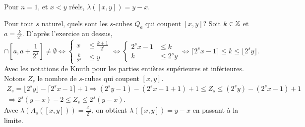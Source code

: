  \begin{propn}
  Pour $n=1$, et $x < y$ réels, $\lambda([x,y]) = y - x$.
 \end{propn}
 \begin{demo}
  Pour tout $s$ naturel, quels sont les $s$-cubes $Q_a$ qui coupent $[x,y]$?\newline
  Soit $k\in \mathbb{Z}$ et $a=\frac{k}{2^s}$. D'après l'exercice au dessus,
  \begin{displaymath}
    [x,y] \cap [a, a+\frac{1}{2^s}] \neq \emptyset
    \Leftrightarrow
    \left\lbrace
    \begin{aligned}
       x &\leq \frac{k + 1}{2^s} \\
       \frac{k}{2^s} &\leq y
    \end{aligned}
    \right.
    \Leftrightarrow
    \left\lbrace
    \begin{aligned}
       2^s x -1 &\leq k \\
       k &\leq 2^s y
    \end{aligned}
    \right.
    \Leftrightarrow
    \lceil 2^s x -1 \rceil \leq k \leq \lfloor 2^s y \rfloor .
  \end{displaymath}
Avec les notations de Knuth pour les parties entières supérieures et inférieures. Notons $Z_s$ le nombre de $s$-cubes qui coupent $[x,y]$.
\begin{multline*}
 Z_s = \lfloor 2^s y \rfloor - \lceil 2^s x -1 \rceil + 1 \Rightarrow
 (2^s y-1) - (2^s x -1+1) + 1\leq Z_s \leq (2^s y) - (2^s x -1) + 1 \\
 \Rightarrow
 2^s(y-x) - 2 \leq Z_s \leq 2^s(y-x).
\end{multline*}
Avec $\lambda(A_s([x,y])) = \frac{Z_s}{2^s}$, on obtient $\lambda([x,y])= y-x$ en passant à la limite.
\end{demo}

